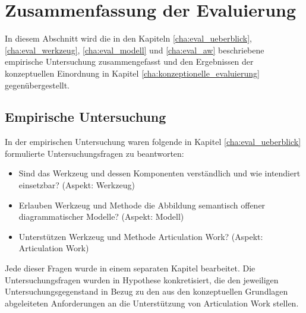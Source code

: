 
\section{Zusammenfassung der Evaluierung}
\label{sec:zusammenfassung_der_evaluierung}

In diesem Abschnitt wird die in den Kapiteln \ref{cha:eval_ueberblick}, \ref{cha:eval_werkzeug}, \ref{cha:eval_modell} und \ref{cha:eval_aw} beschriebene empirische Untersuchung zusammengefasst und den Ergebnissen der konzeptuellen Einordnung in Kapitel \ref{cha:konzeptionelle_evaluierung} gegenübergestellt.

\subsection{Empirische Untersuchung}

In der empirischen Untersuchung waren folgende in Kapitel \ref{cha:eval_ueberblick} formulierte Untersuchungsfragen zu beantworten:

\begin{itemize}
 \item Sind das Werkzeug und dessen Komponenten verständlich und wie intendiert einsetzbar? (Aspekt: Werkzeug)
 \item Erlauben Werkzeug und Methode die Abbildung semantisch offener diagrammatischer Modelle? (Aspekt: Modell)
 \item Unterstützen Werkzeug und Methode Articulation Work? (Aspekt: Articulation Work)
\end{itemize}

Jede dieser Fragen wurde in einem separaten Kapitel bearbeitet. Die Untersuchungsfragen wurden in Hypothese konkretisiert, die den jeweiligen Untersuchungsgegenstand in Bezug zu den aus den konzeptuellen Grundlagen abgeleiteten Anforderungen an die Unterstützung von Articulation Work stellen.

